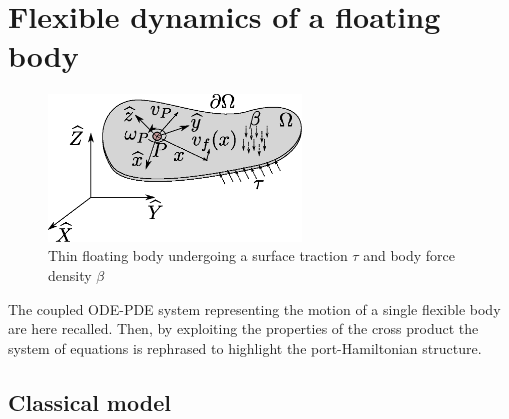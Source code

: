 \documentclass{svjour3}                     %
\begin{document}
 

\section{Flexible dynamics of a floating body}
\label{sec:class_model}
\begin{figure}[t]
	\centering
	\includegraphics[width=0.6\textwidth]{floating_body.eps} 
	\caption{Thin floating body undergoing a surface traction $\tau$ and body force density $\beta$}
	\label{fig:float_body}
\end{figure}
The coupled ODE-PDE system representing the motion of a single flexible body are here recalled. Then, by exploiting the properties of the cross product the system of equations is rephrased to highlight the port-Hamiltonian structure.

\subsection{Classical model}
\end{document}
